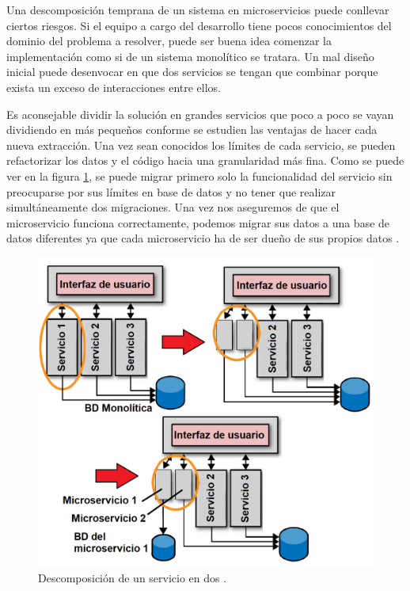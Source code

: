 \documentclass[11pt,spanish,listoffigures]{tfgetsinf}
\begin{document}
Una descomposición temprana de un sistema en microservicios puede conllevar ciertos riesgos. Si el equipo a cargo del desarrollo tiene pocos conocimientos del dominio del problema a resolver, puede  ser buena idea comenzar la implementación como si de un sistema monolítico se tratara. Un mal diseño inicial puede desenvocar en que dos servicios se tengan que combinar porque exista un exceso de interacciones entre ellos. 

Es aconsejable dividir la solución en grandes servicios que poco a poco se vayan dividiendo en más pequeños conforme se estudien las ventajas de hacer cada nueva extracción. Una vez sean conocidos los límites de cada servicio, se pueden refactorizar los datos y el código hacia una granularidad más fina. Como se puede ver en la figura \ref{fig:refactoring}, se puede migrar primero solo la funcionalidad del servicio sin preocuparse por sus límites en base de datos y no tener que realizar simultáneamente dos migraciones. Una vez nos aseguremos de que el microservicio funciona correctamente, podemos migrar sus datos a una base de datos diferentes ya que cada microservicio ha de ser dueño de sus propios datos \cite{Richards2016}.

\begin{figure}[h]
\centering
\includegraphics[scale=0.45]{refactoring}
\caption{Descomposición de un servicio en dos \cite{Richards2016}.}
\label{fig:refactoring}
\end{figure}
\end{document}
